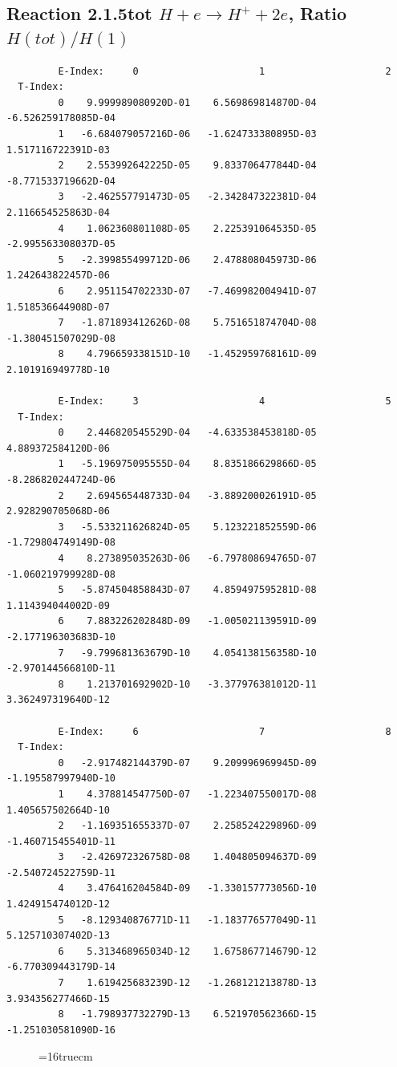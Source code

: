 \documentclass[12pt,dvips]{article}
\begin{document}
\newpage
\subsection{
Reaction 2.1.5tot $ H + e \rightarrow H^+ + 2e$, Ratio $H(tot)/H(1)$
}



\begin{small}\begin{verbatim}
         E-Index:     0                     1                     2
  T-Index:
         0    9.999989080920D-01    6.569869814870D-04   -6.526259178085D-04
         1   -6.684079057216D-06   -1.624733380895D-03    1.517116722391D-03
         2    2.553992642225D-05    9.833706477844D-04   -8.771533719662D-04
         3   -2.462557791473D-05   -2.342847322381D-04    2.116654525863D-04
         4    1.062360801108D-05    2.225391064535D-05   -2.995563308037D-05
         5   -2.399855499712D-06    2.478808045973D-06    1.242643822457D-06
         6    2.951154702233D-07   -7.469982004941D-07    1.518536644908D-07
         7   -1.871893412626D-08    5.751651874704D-08   -1.380451507029D-08
         8    4.796659338151D-10   -1.452959768161D-09    2.101916949778D-10

         E-Index:     3                     4                     5
  T-Index:
         0    2.446820545529D-04   -4.633538453818D-05    4.889372584120D-06
         1   -5.196975095555D-04    8.835186629866D-05   -8.286820244724D-06
         2    2.694565448733D-04   -3.889200026191D-05    2.928290705068D-06
         3   -5.533211626824D-05    5.123221852559D-06   -1.729804749149D-08
         4    8.273895035263D-06   -6.797808694765D-07   -1.060219799928D-08
         5   -5.874504858843D-07    4.859497595281D-08    1.114394044002D-09
         6    7.883226202848D-09   -1.005021139591D-09   -2.177196303683D-10
         7   -9.799681363679D-10    4.054138156358D-10   -2.970144566810D-11
         8    1.213701692902D-10   -3.377976381012D-11    3.362497319640D-12

         E-Index:     6                     7                     8
  T-Index:
         0   -2.917482144379D-07    9.209996969945D-09   -1.195587997940D-10
         1    4.378814547750D-07   -1.223407550017D-08    1.405657502664D-10
         2   -1.169351655337D-07    2.258524229896D-09   -1.460715455401D-11
         3   -2.426972326758D-08    1.404805094637D-09   -2.540724522759D-11
         4    3.476416204584D-09   -1.330157773056D-10    1.424915474012D-12
         5   -8.129340876771D-11   -1.183776577049D-11    5.125710307402D-13
         6    5.313468965034D-12    1.675867714679D-12   -6.770309443179D-14
         7    1.619425683239D-12   -1.268121213878D-13    3.934356277466D-15
         8   -1.798937732279D-13    6.521970562366D-15   -1.251030581090D-16

\end{verbatim}\end{small}
\begin{figure} \label{2.1.5tot}
\epsfxsize=16truecm
\end{figure}
\end{document}
